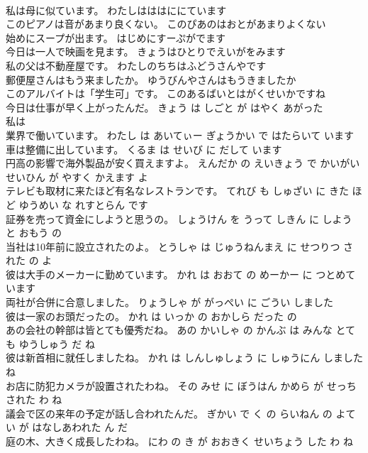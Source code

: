 \documentclass[8pt]{extreport}
\begin{document}
\begin{CJK}{UTF8}{min}
\\	私は母に似ています。	わたしはははににています 
\\	このピアノは音があまり良くない。	このぴあのはおとがあまりよくない 
\\	始めにスープが出ます。	はじめにすーぷがでます 
\\	今日は一人で映画を見ます。	きょうはひとりでえいがをみます 
\\	私の父は不動産屋です。	わたしのちちはふどうさんやです 
\\	郵便屋さんはもう来ましたか。	ゆうびんやさんはもうきましたか 
\\	このアルバイトは「学生可」です。	このあるばいとはがくせいかですね 
\\	今日は仕事が早く上がったんだ。	きょう は しごと が はやく あがった 
\\	私は
\\	業界で働いています。	わたし は あいてぃー ぎょうかい で はたらいて います 
\\	車は整備に出しています。	くるま は せいび に だして います 
\\	円高の影響で海外製品が安く買えますよ。	えんだか の えいきょう で かいがい せいひん が やすく かえます よ 
\\	テレビも取材に来たほど有名なレストランです。	てれび も しゅざい に きた ほど ゆうめい な れすとらん です 
\\	証券を売って資金にしようと思うの。	しょうけん を うって しきん に しよう と おもう の 
\\	当社は10年前に設立されたのよ。	とうしゃ は じゅうねんまえ に せつりつ された の よ 
\\	彼は大手のメーカーに勤めています。	かれ は おおて の めーかー に つとめて います 
\\	両社が合併に合意しました。	りょうしゃ が がっぺい に ごうい しました 
\\	彼は一家のお頭だったの。	かれ は いっか の おかしら だった の 
\\	あの会社の幹部は皆とても優秀だね。	あの かいしゃ の かんぶ は みんな とても ゆうしゅう だ ね 
\\	彼は新首相に就任しましたね。	かれ は しんしゅしょう に しゅうにん しました ね 
\\	お店に防犯カメラが設置されたわね。	その みせ に ぼうはん かめら が せっち された わ ね 
\\	議会で区の来年の予定が話し合われたんだ。	ぎかい で く の らいねん の よてい が はなしあわれた ん だ 
\\	庭の木、大きく成長したわね。	にわ の き が おおきく せいちょう した わ ね 

\end{CJK}
\end{document}
